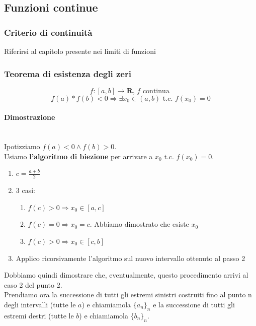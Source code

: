\documentclass{report}
\newcommand{\subsubsubsection}[1]{\paragraph{#1}\mbox{}\\}
\begin{document}
    \subsection{Funzioni continue}
        \subsubsection{Criterio di continuità}
            Riferirsi al capitolo presente nei limiti di funzioni
        \subsubsection{Teorema di esistenza degli zeri}
            $$f:\left[a, b\right] \longrightarrow \mathbf{R}, \, f \textrm{ continua }$$
            $$f\left(a\right) * f\left(b\right) < 0 \Longrightarrow \exists x_0 \in 
                \left(a, b\right) \textrm{ t.c. } f\left(x_0\right) = 0$$
            \subsubsubsection{Dimostrazione}
                Ipotizziamo $f\left(a\right) < 0 \wedge f\left(b\right) > 0$. \\
                Usiamo \textbf{l'algoritmo di biezione} per arrivare a $x_0$ t.c. $f\left(x_0\right) = 0$. \\
                \begin{enumerate}
                    \item $c = \frac{a + b}{2}$
                    \item 3 casi:
                        \begin{enumerate}
                            \item $f\left(c\right) > 0 \Longrightarrow x_0 \in \left[a, c\right]$
                            \item $f\left(c\right) = 0 \Longrightarrow x_0 = c$. Abbiamo dimostrato che esiste $x_0$
                            \item $f\left(c\right) > 0 \Longrightarrow x_0 \in \left[c, b\right]$
                        \end{enumerate}
                    \item Applico ricorsivamente l'algoritmo sul nuovo intervallo ottenuto al passo 2
                \end{enumerate}
                Dobbiamo quindi dimostrare che, eventualmente, questo procedimento arrivi al caso 2 del punto 2. \\
                Prendiamo ora la successione di tutti gli estremi sinistri costruiti fino al punto n degli intervalli (tutte le $a$) e chiamiamola
                $\{a_n\}_n$ e la successione di tutti gli estremi destri (tutte le $b$) e chiamiamola $\{b_n\}_n$. \\
\end{document}
